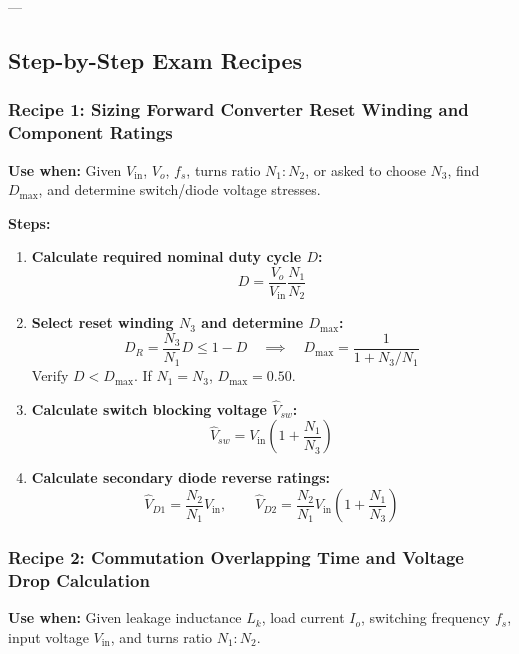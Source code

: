 ---

\subsection{Step-by-Step Exam Recipes}

\subsubsection{Recipe 1: Sizing Forward Converter Reset Winding and Component Ratings}
\textbf{Use when:} Given $V_{\mathrm{in}}$, $V_o$, $f_s$, turns ratio $N_1:N_2$, or asked to choose $N_3$, find $D_{\max}$, and determine switch/diode voltage stresses.

\textbf{Steps:}
\begin{enumerate}
  \item \textbf{Calculate required nominal duty cycle $D$:}
  \[
  D = \frac{V_o}{V_{\mathrm{in}}} \frac{N_1}{N_2}
  \]
  \item \textbf{Select reset winding $N_3$ and determine $D_{\max}$:}
  \[
  D_R = \frac{N_3}{N_1} D \le 1 - D \quad\implies\quad D_{\max} = \frac{1}{1 + N_3/N_1}
  \]
  Verify $D < D_{\max}$. If $N_1 = N_3$, $D_{\max} = 0.50$.
  \item \textbf{Calculate switch blocking voltage $\hat{V}_{sw}$:}
  \[
  \hat{V}_{sw} = V_{\mathrm{in}} \left(1 + \frac{N_1}{N_3}\right)
  \]
  \item \textbf{Calculate secondary diode reverse ratings:}
  \[
  \hat{V}_{D1} = \frac{N_2}{N_1} V_{\mathrm{in}}, \qquad \hat{V}_{D2} = \frac{N_2}{N_1} V_{\mathrm{in}} \left(1 + \frac{N_1}{N_3}\right)
  \]
\end{enumerate}

\subsubsection{Recipe 2: Commutation Overlapping Time and Voltage Drop Calculation}
\textbf{Use when:} Given leakage inductance $L_k$, load current $I_o$, switching frequency $f_s$, input voltage $V_{\mathrm{in}}$, and turns ratio $N_1:N_2$.

